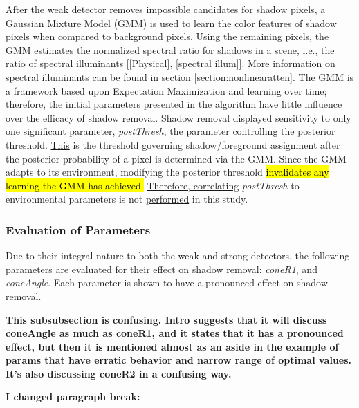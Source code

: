 \documentclass[12pt]{report}
\newcommand{\comment}[1]
           {\par {\bfseries \color{blue} #1 \par}}
\begin{document}
After the weak detector removes impossible candidates for shadow pixels, a Gaussian Mixture Model (GMM) is used to learn the color features of shadow pixels when compared to background pixels. Using the remaining pixels, the GMM estimates the normalized spectral ratio for shadows in a scene, i.e., the ratio of spectral illuminants [\ref{Physical}, \ref{spectral illum}]. More information on spectral illuminants can be found in section \ref{section:nonlinearatten}. The GMM is a framework based upon Expectation Maximization and learning over time; therefore, the initial parameters presented in the algorithm have little influence over the efficacy of shadow removal. Shadow removal displayed sensitivity to only one significant parameter, \textit{postThresh}, the parameter controlling the posterior threshold. \underline{This} is the threshold governing shadow/foreground assignment after the posterior probability of a pixel is determined via the GMM. Since the GMM adapts to its environment, modifying the posterior threshold \hl{invalidates any learning the GMM has achieved.} \underline{Therefore, correlating} \textit{postThresh} to environmental parameters is not \underline{performed} in this study.

\subsubsection{Evaluation of Parameters}

Due to their integral nature to both the weak and strong detectors, the following parameters are evaluated for their effect on shadow removal: \textit{coneR1}, and \textit{coneAngle}. Each parameter is shown to have a pronounced effect on shadow removal. 
\comment{This subsubsection is confusing.  Intro suggests that it will discuss coneAngle as much as coneR1, and it states that it has a pronounced effect, but then it is mentioned  almost as an aside in the example of params that have erratic behavior and narrow range of optimal values.  It's also discussing coneR2 in a confusing way.}

\comment{I changed paragraph break:}
\end{document}
